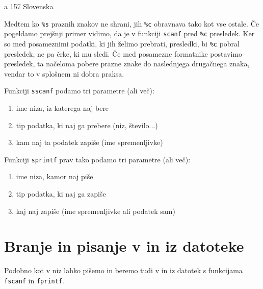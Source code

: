 \begin{examples}


\begin{inout}

\tcblower
a 157 Slovenska
\end{inout}

\end{examples}

\begin{errors}
Medtem ko \verb+%s+ praznih znakov ne shrani, jih \verb+%c+ obravnava tako kot
vse ostale. Če pogeldamo prejšnji primer vidimo, da je v funkciji
\verb+scanf+ pred \verb+%c+ presledek. Ker so med posameznimi podatki, ki
jih želimo prebrati, presledki, bi \verb+%c+ pobral presledek, ne pa črke,
ki mu sledi. Če med posamezne formatnike postavimo presledek, ta načeloma
pobere prazne znake do naslednjega drugačnega znaka, vendar to v splošnem
ni dobra praksa.
\end{errors}

\noindent Funkciji \verb+sscanf+ podamo tri parametre (ali več):
\begin{enumerate}
	\item ime niza, iz katerega naj bere
	\item tip podatka, ki naj ga prebere (niz, število...)
	\item kam naj ta podatek zapiše (ime spremenljivke)
\end{enumerate}
	
\noindent Funkciji \verb+sprintf+ prav tako podamo tri parametre (ali več):
\begin{enumerate}
	\item ime niza, kamor naj piše
	\item tip podatka, ki naj ga zapiše
	\item kaj naj zapiše (ime spremenljivke ali podatek sam)
\end{enumerate}

\pagebreak
\section{Branje in pisanje v in iz datoteke}

Podobno kot v niz lahko pišemo in beremo tudi v in iz datotek s funkcijama \verb+fscanf+ in \verb+fprintf+.

